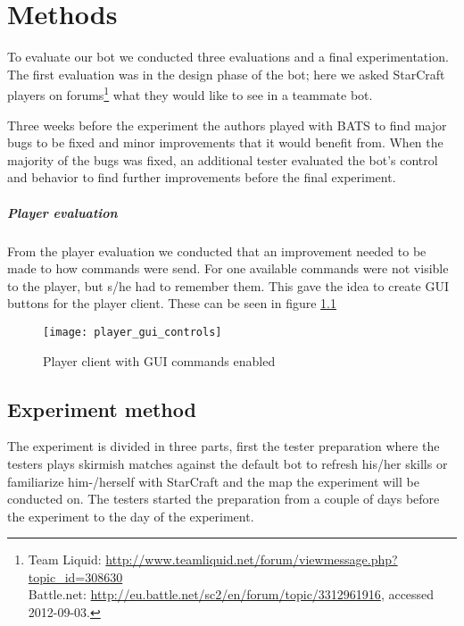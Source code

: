 \chapter{Methods}
To evaluate our bot we conducted three evaluations and a final experimentation. The first evaluation
was in the design phase of the bot; here we asked StarCraft players on forums\footnote{ Team Liquid:
\url{http://www.teamliquid.net/forum/viewmessage.php?topic\_id=308630}\\ Battle.net:
\url{http://eu.battle.net/sc2/en/forum/topic/3312961916}, accessed 2012-09-03.} what they would like
to see in a teammate bot.

Three weeks before the experiment the authors played with BATS to find major bugs to be fixed and
minor improvements that it would benefit from. When the majority of the bugs was fixed, an additional
tester evaluated the bot’s control and behavior to find further improvements before the final experiment.

\paragraph{Player evaluation}
From the player evaluation we conducted that an improvement needed to be made to how commands were
send. For one available commands were not visible to the player, but s/he had to remember them.
This gave the idea to create GUI buttons for the player client. These can be seen in figure
\ref{fig:player_commands_gui}

\begin{figure}[htb]
\centering
\texttt{[image: player\_gui\_controls]}
\caption{Player client with GUI commands enabled}
\label{fig:player_commands_gui}
\end{figure}

\section{Experiment method}
The experiment is divided in three parts, first the tester preparation where the testers plays
skirmish matches against the default bot to refresh his/her skills or familiarize him-/herself with
StarCraft and the map the experiment will be conducted on. The testers started the preparation
from a couple of days before the experiment to the day of the experiment.

